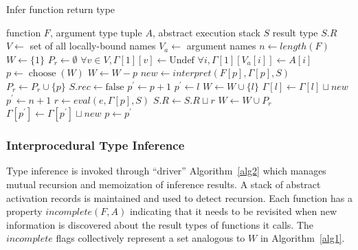 \documentclass[9pt]{sigplanconf}
\begin{document}
\begin{algorithm}
\caption{Infer function return type}
\label{alg1}
\begin{algorithmic}
\REQUIRE function $F$, argument type tuple $A$, abstract execution stack $S$
\ENSURE result type $S.R$
\STATE $V \leftarrow$ set of all locally-bound names
\STATE $V_{a} \leftarrow$ argument names
\STATE $n \leftarrow length(F)$
\STATE $W \leftarrow \{1\}$ 
\STATE $P_r \leftarrow \emptyset$ 
\STATE $\forall v \in V, \Gamma[1][v] \leftarrow \text{Undef}$
\STATE $\forall i, \Gamma[1][V_{a}[i]] \leftarrow A[i]$  
 \STATE $p \leftarrow \operatorname{choose}(W)$
 \REPEAT
  \STATE $W \leftarrow W - p$
  \STATE $new \leftarrow interpret(F[p],\Gamma[p],S)$
   \STATE $P_r \leftarrow P_r \cup \{p\}$
   \STATE $S.rec \leftarrow \text{false}$
  \ENDIF
  \STATE $p^{\prime} \leftarrow p+1$
   \STATE $p^{\prime} \leftarrow l$
    \STATE $W \leftarrow W \cup \{l\}$
    \STATE $\Gamma[l] \leftarrow \Gamma[l] \sqcup new$
   \ENDIF
   \STATE $p^{\prime} \leftarrow n+1$
   \STATE $r \leftarrow eval(e,\Gamma[p],S)$
    \STATE $S.R \leftarrow S.R \sqcup r$
    \STATE $W \leftarrow W \cup P_r$
   \ENDIF
  \ENDIF
   \STATE $\Gamma[p^{\prime}] \leftarrow \Gamma[p^{\prime}] \sqcup new$
   \STATE $p \leftarrow p^{\prime}$
  \ENDIF
\ENDWHILE
{}
\end{algorithmic}
\end{algorithm}

\subsubsection{Interprocedural Type Inference}

Type inference is invoked through ``driver'' Algorithm~\ref{alg2}
which manages mutual recursion and memoization of inference results.
A stack of abstract activation records is maintained and used to detect
recursion. Each function has a property $incomplete(F,A)$ indicating that
it needs to be revisited when new information is discovered about the
result types of functions it calls. The $incomplete$ flags collectively
represent a set analogous to $W$ in Algorithm~\ref{alg1}.
\end{document}
